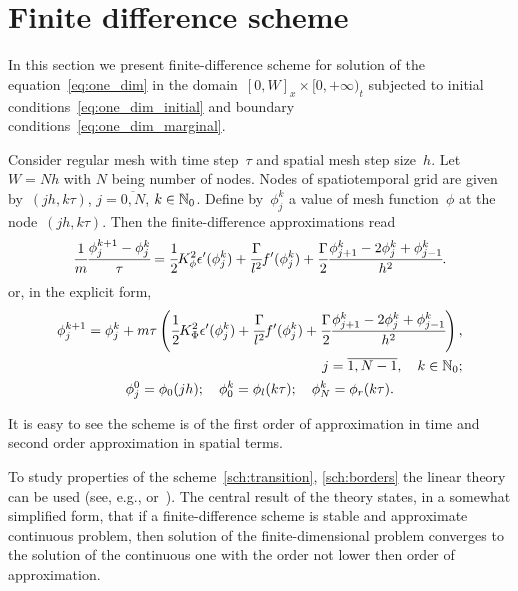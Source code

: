 
\section{Finite difference scheme}
\label{sec:differential_scheme}

In this section we present finite-difference scheme for solution of
the equation~\eqref{eq:one_dim} in the domain~$[0, W]_x \times [0,
+\infty)_t$
subjected to initial conditions~\eqref{eq:one_dim_initial} and boundary conditions~\eqref{eq:one_dim_marginal}.

Consider regular mesh with time step~$\tau$ and
spatial mesh step size~$h$. Let~$W = Nh$ with $N$ being number of
nodes. Nodes of spatiotemporal grid are given by~$(jh, k \tau)$,
$j = \overline{0, N}$, $k \in {\mathbb{N}}_0$. Define by~$\phi_j^k$
a value of mesh function~$\phi$ at the node~$(jh, k \tau)$.
Then the finite-difference approximations read
\begin{equation}
  \cfrac{1}{m} \cfrac{{\phi}_j^{k + 1} - {\phi}_j^k}{\tau} = \cfrac{1}{2} K_\phi^2 \epsilon'(\phi_j^k) + \cfrac{\Gamma}{l^2} f'(\phi_j^k) + \cfrac{\Gamma}{2} \cfrac{{\phi}_{j + 1}^k - 2 {\phi}_j^k + {\phi}_{j - 1}^k}{h^2} {\text{.}}
  \label{eq:subtractive}
\end{equation}
or, in the explicit form,
\begin{gather}
  \begin{aligned}
    \phi_j^{k + 1} = \phi_j^k + m \tau \left( \cfrac{1}{2} K_\Phi^2 \epsilon'(\phi_j^k) + \cfrac{\Gamma}{l^2} f'(\phi_j^k) + \cfrac{\Gamma}{2} \cfrac{{\phi}_{j + 1}^k - 2 {\phi}_j^k + {\phi}_{j - 1}^k}{h^2} \right), \\ j = \overline{1, N - 1}, \quad k \in {\mathbb{N}}_0 {\text{;}}
  \end{aligned}
  \label{sch:transition} \\
  \phi_j^0 = \phi_0(jh); \quad \phi_0^k = \phi_l(k \tau); \quad \phi_N^k = \phi_r(k \tau) {\text{.}}
  \label{sch:borders}
\end{gather}

It is easy to see the scheme is of the first order of approximation in
time and second order approximation in spatial terms.

To study properties of the scheme~\eqref{sch:transition}, \eqref{sch:borders}
the linear theory can be used (see, e.g.,
\cite[Chapter~10]{bahvalov_computational_methods}
or~\cite[Chapter~IX]{kalitkin_computational_methods}).
The central result of the theory states, in a somewhat simplified
form, that if a finite-difference scheme is stable and approximate
continuous problem, then solution of the finite-dimensional problem
converges to the solution of the continuous one with the order
not lower then order of approximation.

